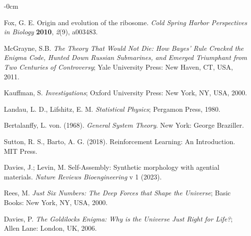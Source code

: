 \documentclass[entropy,article,submit,pdftex,moreauthors]{Definitions/mdpi}
\begin{document}
\begin{adjustwidth}{-\extralength}{0cm}
\begin{thebibliography}{999}
Fox, G. E. 
Origin and evolution of the ribosome. 
\textit{Cold Spring Harbor Perspectives in Biology} \textbf{2010}, \textit{2}(9), a003483.

McGrayne, S.B. \textit{The Theory That Would Not Die: How Bayes' Rule Cracked the Enigma Code, Hunted Down Russian Submarines, and Emerged Triumphant from Two Centuries of Controversy}; Yale University Press: New Haven, CT, USA, 2011.

Kauffman, S. \textit{Investigations}; Oxford University Press: New York, NY, USA, 2000.

Landau, L. D., Lifshitz, E. M. \textit{Statistical Physics}; Pergamon Press, 1980.

Bertalanffy, L. von. (1968). \textit{General System Theory}. New York: George Braziller.

Sutton, R. S., Barto, A. G. (2018). Reinforcement Learning: An Introduction. MIT Press.

Davies, J.; Levin, M. Self-Assembly: Synthetic morphology with agential materials. \textit{Nature Reviews Bioengineering} v 1 (2023).

Rees, M. \textit{Just Six Numbers: The Deep Forces that Shape the Universe}; Basic Books: New York, NY, USA, 2000.

Davies, P. \textit{The Goldilocks Enigma: Why is the Universe Just Right for Life?}; Allen Lane: London, UK, 2006.


\end{thebibliography}

%



\end{adjustwidth}
\end{document}
